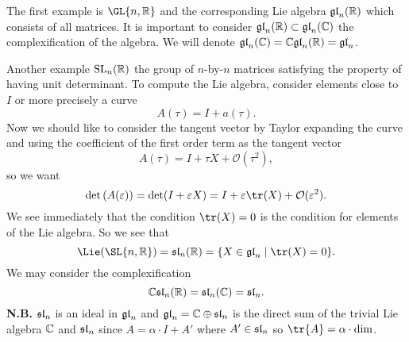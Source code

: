 
The first example is $\GL{n,\Bbb{R}}$ and the corresponding Lie
algebra $\frak{gl}_{n}(\Bbb{R})$ which consists of all
matrices. It is important to consider
$\frak{gl}_{n}(\Bbb{R})\subset\frak{gl}_{n}(\Bbb{C})$ the
complexification of the algebra. We will denote
$\frak{gl}_{n}(\Bbb{C})=\Bbb{C}\frak{gl}_{n}(\Bbb{R})=\frak{gl}_{n}$.

Another example ${\rm SL}_{n}(\Bbb{R})$ the group of $n$-by-$n$
matrices satisfying the property of having unit determinant. To
compute the Lie algebra, consider elements close to $I$ or more
precisely a curve
\begin{equation}
A(\tau)=I+a(\tau).
\end{equation}
Now we should like to consider the tangent vector by Taylor
expanding the curve and using the coefficient of the first order
term as the tangent vector
\begin{equation}
A(\tau)=I+\tau X+\mathcal{O}(\tau^{2}),
\end{equation}
so we want
\begin{equation}
\det\left(A(\varepsilon)\right)=\det(I+\varepsilon X)=I+\varepsilon\tr(X)+\mathcal{O}(\varepsilon^{2}).
\end{equation}
We see immediately that the condition $\tr(X)=0$ is the condition
for elements of the Lie algebra. So we see that
\begin{equation}
\Lie(\SL{n,\Bbb{R}})=\frak{sl}_{n}(\Bbb{R})=\{X\in\frak{gl}_{n}\mid\tr(X)=0\}.
\end{equation}
We may consider the complexification
\begin{equation}
\Bbb{C}\frak{sl}_{n}(\Bbb{R})=\frak{sl}_{n}(\Bbb{C})=\frak{sl}_{n}.
\end{equation}
{\bf N.B.} $\frak{sl}_{n}$ is an ideal in $\frak{gl}_{n}$ and
$\frak{gl}_{n}=\Bbb{C}\oplus\frak{sl}_{n}$ is the direct sum of
the trivial Lie algebra $\Bbb{C}$ and $\frak{sl}_{n}$ since
$A=\alpha\cdot I+A'$ where $A'\in\frak{sl}_{n}$ so
$\tr{A}=\alpha\cdot{\rm dim}$.

